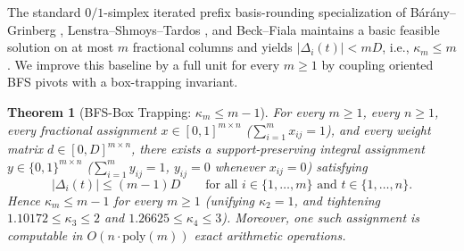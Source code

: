 \documentclass[11pt]{article}
\newtheorem{theorem}{Theorem}
\theoremstyle{definition}
\newcommand{\disc}{\Delta}
\begin{document}
The standard $0/1$-simplex iterated prefix basis-rounding specialization of B\'ar\'any--Grinberg \cite{BaranyGrinberg1981}, Lenstra--Shmoys--Tardos \cite{LST1990}, and Beck--Fiala \cite{BeckFiala1981} maintains a basic feasible solution on at most $m$ fractional columns and yields $|\disc_i(t)|<mD$, i.e., $\kappa_m\le m$. We improve this baseline by a full unit for every $m\ge 1$ by coupling oriented BFS pivots with a box-trapping invariant.

\begin{theorem}[BFS-Box Trapping: $\kappa_m\le m-1$]\label{thm:km1}
For every $m\ge 1$, every $n\ge 1$, every fractional assignment $x\in[0,1]^{m\times n}$ ($\sum_{i=1}^m x_{ij}=1$), and every weight matrix $d\in[0,D]^{m\times n}$, there exists a support-preserving integral assignment $y\in\{0,1\}^{m\times n}$ ($\sum_{i=1}^m y_{ij}=1$, $y_{ij}=0$ whenever $x_{ij}=0$) satisfying
\[
 |\disc_i(t)|\le (m-1)D\qquad\text{for all }i\in\{1,\dots,m\}\text{ and }t\in\{1,\dots,n\}.
\]
Hence $\kappa_m\le m-1$ for every $m\ge 1$ (unifying $\kappa_2=1$, and tightening $1.10172\le \kappa_3\le 2$ and $1.26625\le \kappa_4\le 3$). Moreover, one such assignment is computable in $O(n\cdot\mathrm{poly}(m))$ exact arithmetic operations.
\end{theorem}
\end{document}
